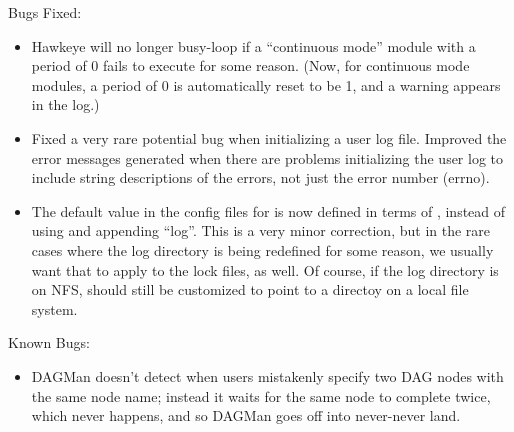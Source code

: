 \noindent Bugs Fixed:
\begin{itemize}

\item Hawkeye will no longer busy-loop if a ``continuous mode''
module with a period of 0 fails to execute for some reason.  (Now, for
continuous mode modules, a period of 0 is automatically reset to be 1, and
a warning appears in the log.)

\item Fixed a very rare potential bug when initializing a user log
file.
Improved the error messages generated when there are problems
initializing the user log to include string descriptions of the
errors, not just the error number (errno).

\item The default value in the config files for  is now
defined in terms of , instead of using 
and appending ``log''.
This is a very minor correction, but in the rare cases where the log
directory is being redefined for some reason, we usually want that to
apply to the lock files, as well.
Of course, if the log directory is on NFS,  should still
be customized to point to a directoy on a local file system.

\end{itemize}

\noindent Known Bugs:
\begin{itemize}

\item DAGMan doesn't detect when users mistakenly specify two
DAG nodes with the same node name; instead it waits for the
same node to complete twice, which never happens, and so DAGMan
goes off into never-never land.

\end{itemize}
